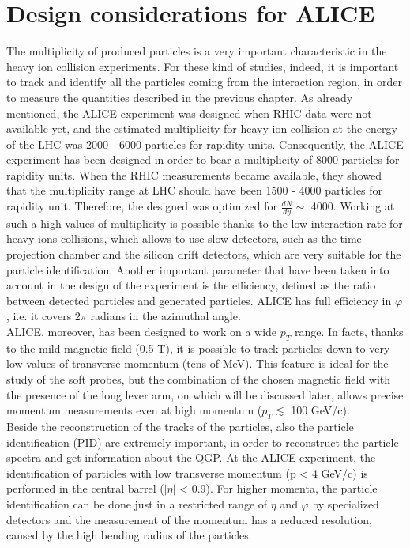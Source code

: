 \section{Design considerations for ALICE}
The multiplicity of produced particles is a very important characteristic in the heavy ion collision experiments. For these kind of studies, indeed, it is important to track and identify all the particles coming from the interaction region, in order to measure the quantities described in the previous chapter. As already mentioned, the ALICE experiment was designed when RHIC data were not available yet, and the estimated multiplicity for heavy ion collision at the energy of the LHC was 2000 - 6000 particles for rapidity units. Consequently, the ALICE experiment has been designed in order to bear a multiplicity of 8000 particles for rapidity units. When the RHIC measurements became available, they showed that the multiplicity range at LHC should have been 1500 - 4000 particles for rapidity unit. Therefore, the designed was optimized for $\frac{dN}{dy}\sim$ 4000. Working at such a high values of multiplicity is possible thanks to the low interaction rate for heavy ions collisions, which allows to use slow detectors, such as the time projection chamber and the silicon drift detectors, which are very suitable for the particle identification. Another important parameter that have been taken into account in the design of the experiment is the efficiency, defined as the ratio between detected particles and generated particles. ALICE has full efficiency in $\varphi$, i.e. it covers $2\pi$ radians in the azimuthal angle.\\
ALICE, moreover, has been designed to work on a wide $p_T$ range. In facts, thanks to the mild magnetic field (0.5 T), it is possible to track particles down to very low values of transverse momentum (tens of MeV). This feature is ideal for the study of the soft probes, but the combination of the chosen magnetic field with the presence of the long lever arm, on which will be discussed later, allows precise momentum measurements even at high momentum ($p_T\lesssim$ 100 GeV/c).\\
Beside the reconstruction of the tracks of the particles, also the particle identification (PID) are extremely important, in order to reconstruct the particle spectra and get information about the QGP. At the ALICE experiment, the identification of particles with low transverse momentum (p < 4 GeV/c) is performed in the central barrel ($|\eta|$ < 0.9). For higher momenta, the particle identification can be done just in a restricted range of $\eta$ and $\varphi$ by specialized detectors and the measurement of the momentum has a reduced resolution, caused by the high bending radius of the particles.\\
